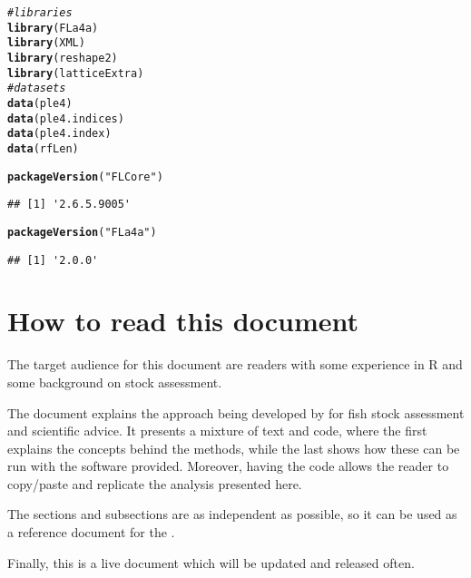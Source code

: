 \documentclass[a4paper,english,10pt]{article}\usepackage[]{graphicx}\usepackage[]{color}
\makeatletter
\newcommand{\hlstr}[1]{\textcolor[rgb]{0.192,0.494,0.8}{#1}}%
\newcommand{\hlcom}[1]{\textcolor[rgb]{0.678,0.584,0.686}{\textit{#1}}}%
\newcommand{\hlstd}[1]{\textcolor[rgb]{0.345,0.345,0.345}{#1}}%
\newcommand{\hlkwd}[1]{\textcolor[rgb]{0.737,0.353,0.396}{\textbf{#1}}}%
\newenvironment{kframe}{%
 \def\at@end@of@kframe{}%
 \ifinner\ifhmode%
  \def\at@end@of@kframe{\end{minipage}}%
  \begin{minipage}{\columnwidth}%
 \fi\fi%
 \def\FrameCommand##1{\hskip\@totalleftmargin \hskip-\fboxsep
 \colorbox{shadecolor}{##1}\hskip-\fboxsep
     \hskip-\linewidth \hskip-\@totalleftmargin \hskip\columnwidth}%
 \MakeFramed {\advance\hsize-\width
   \@totalleftmargin\z@ \linewidth\hsize
   \@setminipage}}%
 {\par\unskip\endMakeFramed%
 \at@end@of@kframe}
\newenvironment{knitrout}{}{} %
\makeatother
\begin{document}
\begin{knitrout}
\color{fgcolor}\begin{kframe}
\begin{alltt}
\hlcom{# libraries}
\hlkwd{library}\hlstd{(FLa4a)}
\hlkwd{library}\hlstd{(XML)}
\hlkwd{library}\hlstd{(reshape2)}
\hlkwd{library}\hlstd{(latticeExtra)}
\hlcom{# datasets}
\hlkwd{data}\hlstd{(ple4)}
\hlkwd{data}\hlstd{(ple4.indices)}
\hlkwd{data}\hlstd{(ple4.index)}
\hlkwd{data}\hlstd{(rfLen)}
\end{alltt}
\end{kframe}
\end{knitrout}

\begin{knitrout}
\color{fgcolor}\begin{kframe}
\begin{alltt}
\hlkwd{packageVersion}\hlstd{(}\hlstr{"FLCore"}\hlstd{)}
\end{alltt}
\begin{verbatim}
## [1] '2.6.5.9005'
\end{verbatim}
\begin{alltt}
\hlkwd{packageVersion}\hlstd{(}\hlstr{"FLa4a"}\hlstd{)}
\end{alltt}
\begin{verbatim}
## [1] '2.0.0'
\end{verbatim}
\end{kframe}
\end{knitrout}



\section{How to read this document}

The target audience for this document are readers with some experience in R and some background on stock assessment.

The document explains the approach being developed by \aFa for fish stock assessment and scientific advice. It presents a mixture of text and code, where the first explains the concepts behind the methods, while the last shows how these can be run with the software provided. Moreover, having the code allows the reader to copy/paste and replicate the analysis presented here.

The sections and subsections are as independent as possible, so it can be used as a reference document for the . 



Finally, this is a live document which will be updated and released often.
\end{document}
